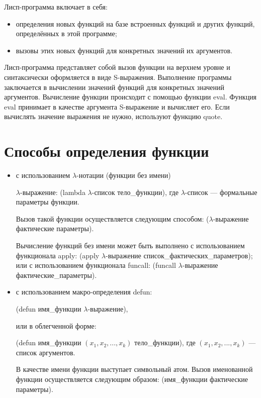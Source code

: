\documentclass[12pt]{report}
\begin{document}
Лисп-программа включает в себя:
\begin{itemize}
	\item определения новых функций на базе встроенных функций и других функций, определённых в этой программе;
	\item вызовы этих новых функций для конкретных значений их аргументов.
\end{itemize}

Лисп-программа представляет собой вызов функции на верхнем уровне и синтаксически оформляется в виде S-выражения.
Выполнение программы заключается в вычислении значений функций для конкретных
значений аргументов. Вычисление функции происходит с помощью функции eval. Функция eval принимает в качестве аргумента S-выражение и вычисляет его.  Если вычислять значение выражения не нужно, используют
функцию quote.


\section{Способы определения функции}

\begin{itemize}
    \item с использованием $\lambda$-нотации (функции без имени)
	
            $\lambda$-выражение: (lambda $\lambda$-список тело\_функции), 
            где $\lambda$-список --- формальные параметры функции.
	
            Вызов такой функции осуществляется следующим способом: ($\lambda$-выражение фактические параметры).

            Вычисление функций без имени может быть выполнено с использованием функционала apply: (apply $\lambda$-выражение список\_фактических\_параметров); или с использованием функционала funcall: (funcall $\lambda$-выражение фактические\_параметры).
	
    \item с использованием макро-определения defun: 
	
	(defun имя\_функции $\lambda$-выражение), 
	
	или  в облегченной форме:
	
	(defun имя\_функции $(x_1, x_2, ..., x_k)$ тело\_функции), 
	где $(x_1, x_2, ..., x_k)$ --- список аргументов.
	
	В качестве имени функции выступает символьный атом. 
	Вызов именованной функции осуществляется следующим образом: (имя\_функции фактические параметры).
\end{itemize} 
\end{document}
